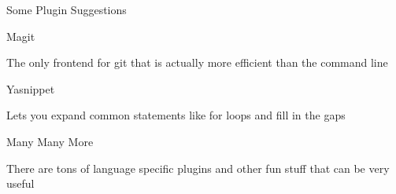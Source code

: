 \documentclass[presentation]{beamer}
\begin{document}
\begin{frame}[label=sec-6]{Some Plugin Suggestions}
\begin{block}{Magit}
\begin{block}{The only frontend for git that is actually more efficient than the command line}
\end{block}
\end{block}
\begin{block}{Yasnippet}
\begin{block}{Lets you expand common statements like for loops and fill in the gaps}
\end{block}
\end{block}
\begin{block}{Many Many More}
\begin{block}{There are tons of language specific plugins and other fun stuff that can be very useful}
\end{block}
\end{block}
\end{frame}
\end{document}
